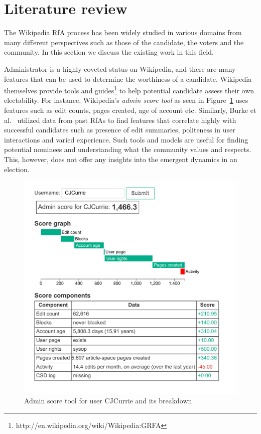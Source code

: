\section{Literature review}
\label{sec:literature-review}

The Wikipedia RfA process has been widely studied in various domains from many different perspectives such as those of the candidate, the voters and the community. In this section we discuss the existing work in this field.

Administrator is a highly coveted status on Wikipedia, and there are many features that can be used to determine the worthiness of a candidate. Wikipedia themselves provide tools and guides\footnote{http://en.wikipedia.org/wiki/Wikipedia:GRFA} to help potential candidate assess their own electability. For instance, Wikipedia's \textit{admin score tool} as seen in Figure~\ref{fig:admin-score} uses features such as edit counts, pages created, age of account etc. Similarly, Burke et al.\ \cite{BurkeMoppingUp} utilized data from past RfAs to find features that correlate highly with successful candidates such as presence of edit summaries, politeness in user interactions and varied experience. Such tools and models are useful for finding potential nominees and understanding what the community values and respects. This, however, does not offer any insights into the emergent dynamics in an election.
\begin{figure}[h!]
    \centering
    \includegraphics[width=\linewidth]{images/Asynchronous Admin Score.pdf}
    \caption{Admin score tool for user CJCurrie and its breakdown}
    \label{fig:admin-score}
\end{figure}

